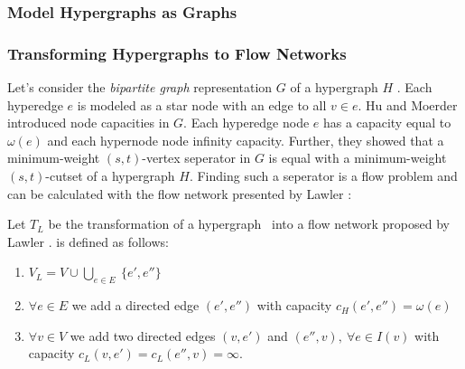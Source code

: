 \subsubsection{Model Hypergraphs as Graphs}
\label{sec:hypergraph_to_graph}

\subsubsection{Transforming Hypergraphs to Flow Networks}
\label{sec:related_lawler}

Let's consider the \emph{bipartite graph} representation $G$ of a hypergraph $H$ \cite{HuMoerder85}.
Each hyperedge $e$ is modeled as a star node with an edge to all $v \in e$.
Hu and Moerder \cite{HuMoerder85} introduced node capacities in $G$. Each hyperedge
node $e$ has a capacity equal to $\omega(e)$ and each hypernode node infinity capacity. 
Further, they showed that a minimum-weight $(s,t)$-vertex seperator in $G$
is equal with a minimum-weight $(s,t)$-cutset of a hypergraph $H$. 
Finding such a seperator is a flow problem and can be calculated with the flow network  
presented by Lawler \cite{lawler1973}:

\begin{definition}
Let $T_L$ be the transformation of a hypergraph \HypergraphDef~into 
a flow network  proposed by Lawler \cite{lawler1973}.  is defined as follows:
\begin{enumerate}
\item $V_L = V \cup \bigcup\limits_{e \in E}\ \{e', e''\}$
\item $\forall e \in E$ we add a directed edge $(e',e'')$ 
      with capacity $c_H(e',e'') = \omega(e)$
\item $\forall v \in V$ we add two directed edges $(v, e')$ and 
      $(e'', v),\ \forall e \in I(v)$ with 
      capacity $c_L(v, e') = c_L(e'',v) = \infty$.
\end{enumerate} 
\end{definition}

